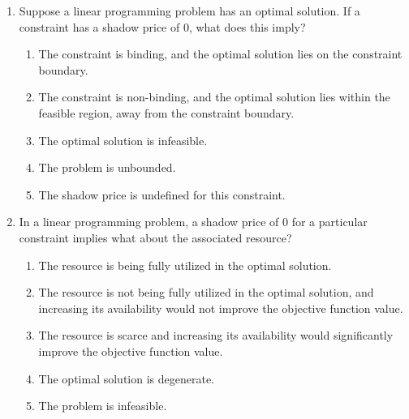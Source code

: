 \documentclass{article}%
\begin{document}
\begin{enumerate}
\begin{enumerate}
\item The optimal solution will remain unchanged if the right-hand side of the constraint is increased by 1 unit.%
\item The shadow price is irrelevant to the optimal objective function value.%
\end{enumerate}%
\vspace{1em}%
\item Suppose a linear programming problem has an optimal solution.  If a constraint has a shadow price of 0, what does this imply?%
\begin{enumerate}%
\item The constraint is binding, and the optimal solution lies on the constraint boundary.%
\item The constraint is non-binding, and the optimal solution lies within the feasible region, away from the constraint boundary.%
\item The optimal solution is infeasible.%
\item The problem is unbounded.%
\item The shadow price is undefined for this constraint.%
\end{enumerate}%
\vspace{1em}%
\item In a linear programming problem, a shadow price of 0 for a particular constraint implies what about the associated resource?%
\begin{enumerate}%
\item The resource is being fully utilized in the optimal solution.%
\item The resource is not being fully utilized in the optimal solution, and increasing its availability would not improve the objective function value.%
\item The resource is scarce and increasing its availability would significantly improve the objective function value.%
\item The optimal solution is degenerate.%
\item The problem is infeasible.%
\end{enumerate}%
\vspace{1em}%
\end{enumerate}

%
\newpage%
\end{document}
